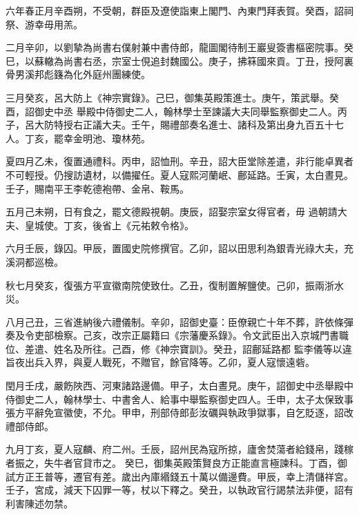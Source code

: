 \begin{pinyinscope}
 六年春正月辛酉朔，不受朝，群臣及遼使詣東上閣門、內東門拜表賀。癸酉，詔祠祭、游幸毋用羔。



 二月辛卯，以劉摯為尚書右僕射兼中書侍郎，龍圖閣待制王巖叟簽書樞密院事。癸巳，以蘇轍為尚書右丞，宗室士俔追封魏國公。庚子，拂箖國來貢。丁丑，授阿裏骨男溪邦彪籛為化外庭州團練使。



 三月癸亥，呂大防上《神宗實錄》。己巳，御集英殿策進士。庚午，策武舉。癸酉，詔御史中丞
 舉殿中侍御史二人，翰林學士至諫議大夫同舉監察御史二人。丙子，呂大防特授右正議大夫。壬午，賜禮部奏名進士、諸科及第出身九百五十七人。丁亥，罷幸金明池、瓊林苑。



 夏四月乙未，復置通禮科。丙申，詔恤刑。辛丑，詔大臣堂除差遣，非行能卓異者不可輕授。仍搜訪遺材，以備擢任。夏人寇熙河蘭岷、鄜延路。壬寅，太白晝見。壬子，賜南平王李乾德袍帶、金帛、鞍馬。



 五月己未朔，日有食之，罷文德殿視朝。庚辰，詔娶宗室女得官者，毋
 過朝請大夫、皇城使。丁亥，後省上《元祐敕令格》。



 六月壬辰，錄囚。甲辰，置國史院修撰官。乙卯，詔以田思利為銀青光祿大夫，充溪洞都巡檢。



 秋七月癸亥，復張方平宣徽南院使致仕。乙丑，復制置解鹽使。己卯，振兩浙水災。



 八月己丑，三省進納後六禮儀制。辛卯，詔御史臺：臣僚親亡十年不葬，許依條彈奏及令吏部檢察。己亥，改宗正屬籍曰《宗藩慶系錄》。令文武臣出入京城門書職位、差遣、姓名及所往。己酉，修《神宗寶訓》。癸丑，詔鄜延路都
 監李儀等以違旨夜出兵入界，與夏人戰死，不贈官，餘官降等。乙卯，夏人寇懷遠砦。



 閏月壬戌，嚴飭陜西、河東諸路邊備。甲子，太白晝見。庚午，詔御史中丞舉殿中侍御史二人，翰林學士、中書舍人、給事中舉監察御史四人。壬申，太子太保致事張方平辭免宣徽使，不允。甲申，刑部侍郎彭汝礪與執政爭獄事，自乞貶逐，詔改禮部侍郎。



 九月丁亥，夏人寇麟、府二州。壬辰，詔州民為寇所掠，廬舍焚蕩者給錢帛，踐稼者振之，失牛者官貸市之。
 癸巳，御集英殿策賢良方正能直言極諫科。丁酉，御試方正王普等，遷官有差。歲出內庫緡錢五十萬以備邊費。甲辰，幸上清儲祥宮。壬子，宮成，減天下囚罪一等，杖以下釋之。癸丑，以執政官行謁禁法非便，詔有利害陳述勿禁。




\end{pinyinscope}
